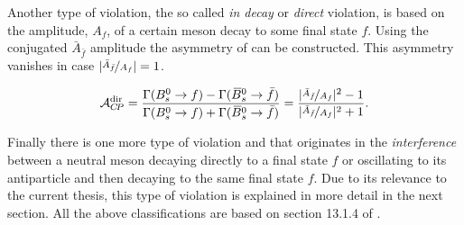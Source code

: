Another type of \CP violation, the so called {\it in decay} or {\it direct} \CP violation, is based on the
amplitude, $A_f$, of a certain meson decay to some final state $f$.
Using the \CP conjugated $\bar{A}_{\bar{f}}$ amplitude the asymmetry of  can be constructed.
This asymmetry vanishes in case $|\nicefrac{\bar{A}_{\bar{f}}}{A_f}| = 1$.

\begin{equation}
  \centering
  \Acp{\text{dir}} = \frac{\Gamma(\Bs \rightarrow f) - \Gamma(\Bsb \rightarrow \bar{f})} {\Gamma(\Bs \rightarrow f) + \Gamma(\Bsb \rightarrow \bar{f})}
                   = \frac{ |\nicefrac{\bar{A}_{\bar{f}}}{A_f}|^2 - 1}{|\nicefrac{\bar{A}_{\bar{f}}}{A_f}|^2 + 1}.
\label{cpv_decay}
\end{equation}

Finally there is one more type of \CP violation and that originates in the {\it interference} between
a neutral meson decaying directly to a final state $f$ or oscillating to its antiparticle and then decaying
to the same final state $f$. Due to its relevance to the current thesis, this type of \CP violation is explained
in more detail in the next section. All the above classifications are based on section 13.1.4 of \cite{PDG}.
